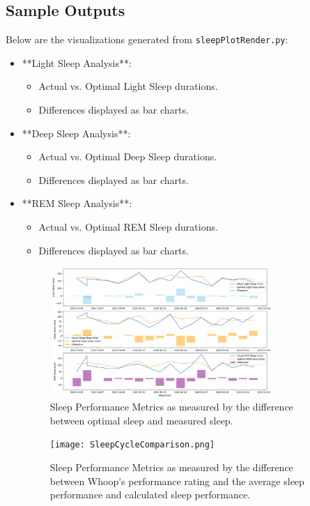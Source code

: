 \documentclass{article}
\begin{document}
\subsection{Sample Outputs}
Below are the visualizations generated from \texttt{sleepPlotRender.py}:
\begin{itemize}
    \item **Light Sleep Analysis**:
    \begin{itemize}
        \item Actual vs. Optimal Light Sleep durations.
        \item Differences displayed as bar charts.
    \end{itemize}
    \item **Deep Sleep Analysis**:
    \begin{itemize}
        \item Actual vs. Optimal Deep Sleep durations.
        \item Differences displayed as bar charts.
    \end{itemize}
    \item **REM Sleep Analysis**:
    \begin{itemize}
        \item Actual vs. Optimal REM Sleep durations.
        \item Differences displayed as bar charts.
    \end{itemize}

    \begin{figure}[H]
        \centering
        \includegraphics[width=0.8\textwidth]{SleepAnalysisByPhases.png}
        \caption{Sleep Performance Metrics as measured by the difference between optimal sleep and measured sleep.}
        \label{fig:sleep-metrics}
    \end{figure}
    \begin{figure}[H]
        \centering
        \texttt{[image: SleepCycleComparison.png]}
        \caption{Sleep Performance Metrics as measured by the difference between Whoop's performance rating and the average sleep performance and calculated sleep performance.}
        \label{fig:sleep-metrics}
    \end{figure}

\end{itemize}
\end{document}
